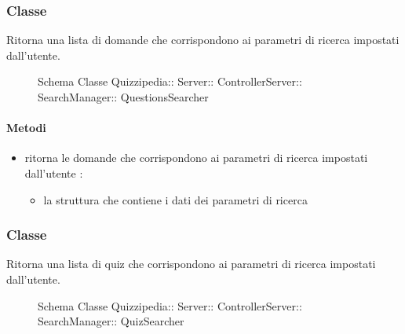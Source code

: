\subsubsection{Classe }
Ritorna una lista di domande che corrispondono ai parametri di ricerca impostati dall'utente.
\begin{figure}[H]
\centering
\noindent{}
\caption[Schema Classe QuestionsSearcher]{Schema Classe Quizzipedia:: Server:: ControllerServer:: SearchManager:: QuestionsSearcher}
\end{figure}
\paragraph{Metodi}
\begin{itemize}
\item {}
\newline
ritorna le domande che corrispondono ai parametri di ricerca impostati dall'utente
\newline
{} :
\begin{itemize}
\item {}
\newline
la struttura che contiene i dati dei parametri di ricerca
\end{itemize}
\end{itemize}
\subsubsection{Classe }
Ritorna una lista di quiz che corrispondono ai parametri di ricerca impostati dall'utente.
\begin{figure}[H]
\centering
\noindent{}
\caption[Schema Classe QuizSearcher]{Schema Classe Quizzipedia:: Server:: ControllerServer:: SearchManager:: QuizSearcher}
\end{figure}
